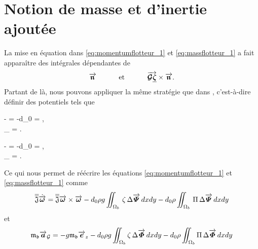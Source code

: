 \section{Notion de masse et d'inertie ajoutée}
\noindent La mise en équation dans \eqref{eq:momentumflotteur_1} et \eqref{eq:massflotteur_1} a fait apparaître des intégrales dépendantes de 
\begin{equation}
	\overrightarrow{\boldsymbol{\mathfrak{n}}} \hspace{1cm}\text{ et }\hspace{1cm}\overrightarrow{\boldsymbol{\mathcal{G}\underline{\boldsymbol{\zeta}}}} \times \overrightarrow{\boldsymbol{\mathfrak{n}}}.
\end{equation}
\noindent Partant de là, nous pouvons appliquer la même stratégie que dans \citet{lannes_dynamics_2017}, c'est-à-dire définir des potentiels tels que
\begin{center}
	\begin{minipage}{0.45\linewidth}
		\begin{subnumcases}{}
		-  = -d_0 \Delta \boldvec{\varPhi} = ,\\
		\piper{\boldvec{\varPhi}}_{\Gamma} = .
		\end{subnumcases}
	\end{minipage}
\hfill
	\begin{minipage}{0.54\linewidth}
		\begin{subnumcases}{}
		-  = -d_0 \Delta \boldvec{\varPsi} =  \times \normalvec,\\
		\piper{\boldvec{\varPsi}}_{\Gamma} = \boldvec{0}.
		\end{subnumcases}
	\end{minipage}
\end{center}
Ce qui nous permet de réécrire les équations  \eqref{eq:momentumflotteur_1} et \eqref{eq:massflotteur_1} comme
\begin{equation}
	\overline{\overline{\mathfrak{J}}}\dot{\overrightarrow{\boldsymbol{\omega}}} =  \overline{\overline{\mathfrak{J}}}\overrightarrow{\boldsymbol{\omega}}\times\overrightarrow{\boldsymbol{\omega}} -d_0 \rho g \iint_{\Omega_b}\,\zeta\, \Delta \overrightarrow{\boldsymbol{\varPsi}} \,dxdy -d_0 \rho \iint_{\Omega_b}\,\Pi\, \Delta \overrightarrow{\boldsymbol{\varPsi}} \,dxdy\label{eq:momentumflotteur_2}
\end{equation}
et 
\begin{equation}
	\mathfrak{m}_{\mathfrak{b}}\overrightarrow{\boldsymbol{a}}_\mathcal{G} = - g\mathfrak{m}_{\mathfrak{b}}\overrightarrow{\boldsymbol{e}}_z - d_0 \rho g\iint_{\Omega_b}\zeta\, \Delta\overrightarrow{\boldsymbol{\varPhi}}\,dxdy - d_0 \rho \iint_{\Omega_b}\Pi\, \Delta\overrightarrow{\boldsymbol{\varPhi}}\,dxdy \label{eq:massflotteur_2}
\end{equation}
